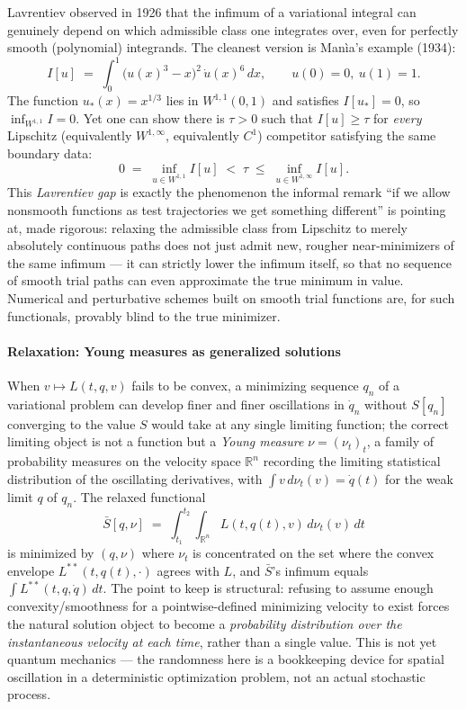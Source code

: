 \begin{example}
\label{ex:lavrentiev}
Lavrentiev observed in 1926 that the infimum of a variational integral can
    genuinely depend on which admissible class one integrates over, even for
    perfectly smooth (polynomial) integrands. The cleanest version is Man\`ia's
    example (1934):
\[
I[u] \;=\; \int_0^1 \bigl(u(x)^3-x\bigr)^2\, \dot u(x)^6\, dx, 
    \qquad u(0)=0,\ u(1)=1.
\]
The function $u_\ast(x)=x^{1/3}$ lies in $W^{1,1}(0,1)$ and satisfies
    $I[u_\ast]=0$, so $\inf_{W^{1,1}} I = 0$. Yet one can show there is
    $\tau>0$ such that $I[u]\ge \tau$ for \emph{every} Lipschitz (equivalently
    $W^{1,\infty}$, equivalently $C^1$) competitor satisfying the same boundary
    data:
\[
0 \;=\; \inf_{u\in W^{1,1}} I[u] \;<\; \tau \;\le\; \inf_{u \in W^{1,\infty}} I[u].
\]
This \emph{Lavrentiev gap} is exactly the phenomenon the informal remark ``if
    we allow nonsmooth functions as test trajectories we get something
    different'' is pointing at, made rigorous: relaxing the admissible class
    from Lipschitz to merely absolutely continuous paths does not just admit
    new, rougher near-minimizers of the same infimum --- it can strictly lower
    the infimum itself, so that no sequence of smooth trial paths can even
    approximate the true minimum in value. Numerical and perturbative schemes
    built on smooth trial functions are, for such functionals, provably blind
    to the true minimizer.
\end{example}

\paragraph{Relaxation: Young measures as generalized solutions}
 When $v\mapsto L(t,q,v)$ fails to be convex, a
minimizing sequence $q_n$ of a variational problem can develop finer and finer
oscillations in $\dot q_n$ without $S[q_n]$ converging to the value $S$ would
take at any single limiting function; the correct limiting object is not a
function but a \emph{Young measure} $\nu=(\nu_t)_{t}$, a family of probability
measures on the velocity space $\mathbb{R}^n$ recording the limiting
statistical distribution of the oscillating derivatives, with $\int
v\,d\nu_t(v)=\dot q(t)$ for the weak limit $q$ of $q_n$. The relaxed functional
\[
\bar S[q,\nu] \;=\; \int_{t_1}^{t_2}\!\!
\int_{\mathbb{R}^n} L(t,q(t),v)\, d\nu_t(v)\, dt
\]
is minimized by $(q,\nu)$ where $\nu_t$ is concentrated on the set where the
convex envelope $L^{\ast\ast}(t,q(t),\cdot)$ agrees with $L$, and $\bar S$'s
infimum equals $\int L^{\ast\ast}(t,q,\dot q)\,dt$. The point to keep is
structural: refusing to assume enough convexity/smoothness for a
pointwise-defined minimizing velocity to exist forces the natural solution
object to become a \emph{probability distribution over the instantaneous
velocity at each time}, rather than a single value. This is not yet quantum
mechanics --- the randomness here is a bookkeeping device for spatial
oscillation in a deterministic optimization problem, not an actual stochastic
process.

